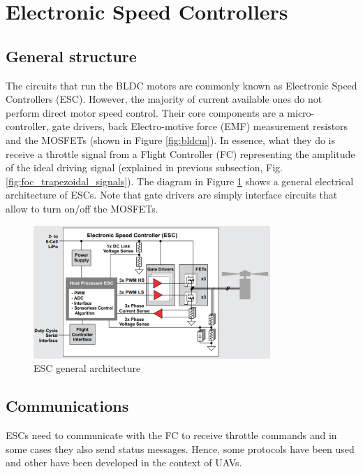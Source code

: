 \section{Electronic Speed Controllers}
\subsection{General structure}
The circuits that run the BLDC motors are commonly known as Electronic Speed Controllers (ESC). However, the majority of current available ones do not perform direct motor speed control. Their core components are a micro-controller, gate drivers, back Electro-motive force (EMF) measurement resistors and the MOSFETs (shown in Figure \ref{fig:bldcm}). In essence, what they do is receive a throttle signal from a Flight Controller (FC) representing the amplitude of the ideal driving signal (explained in previous subsection, Fig. \ref{fig:foc_trapezoidal_signals}). The diagram in Figure \ref{fig:esc_diag} shows a general electrical architecture of ESCs. Note that gate drivers are simply interface circuits that allow to turn on/off the MOSFETs.
\begin{figure}
    \centering
    \includegraphics[width=0.8\textwidth]{images/esc_diagram.PNG}
    \caption{ESC general architecture \cite{Mogensen_ESC_Motor_Control2016}}
    \label{fig:esc_diag}
\end{figure}

\subsection{Communications}
ESCs need to communicate with the FC to receive throttle commands and in some cases they also send status messages. Hence, some protocols have been used and other have been developed in the context of UAVs.

